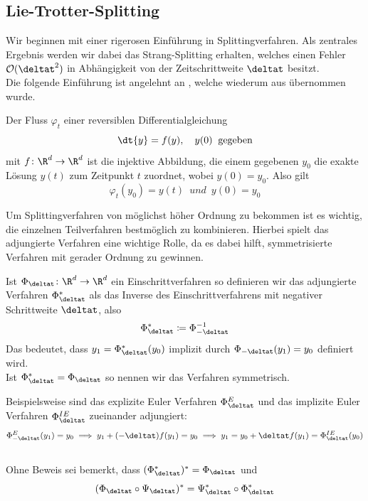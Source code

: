 \subsection{Lie-Trotter-Splitting}
\label{seclietrotter}
Wir beginnen mit einer rigerosen Einführung in Splittingverfahren. Als zentrales Ergebnis werden wir dabei das Strang-Splitting erhalten, welches einen Fehler $\mathcal{O}(\deltat^2)$ in Abhängigkeit von der Zeitschrittweite $\deltat$ besitzt.\\
Die folgende Einführung ist angelehnt an \autocite{patrickdiplom}, welche wiederum aus \autocite[Kapitel II.3 bis II.5]{HairerLubichWanner} übernommen wurde.
\begin{mathdef}
Der Fluss $\varphi_t$ einer reversiblen Differentialgleichung
\begin{equation}
\label{orddgl}
\dt{y}=f(y),\quad y(0)\:\text{ gegeben}
\end{equation}
mit $f\colon \R^d\to\R^d$ ist die injektive Abbildung, die einem gegebenen $y_0$ die exakte Lösung $y(t)$ zum Zeitpunkt $t$ zuordnet, wobei $y(0)=y_0$. Also gilt
\begin{equation*}
\varphi_t(y_0)=y(t)\enspace und\enspace y(0)=y_0
\end{equation*}
\end{mathdef}

Um Splittingverfahren von möglichst höher Ordnung zu bekommen ist es wichtig, die einzelnen Teilverfahren bestmöglich zu kombinieren. Hierbei spielt das adjungierte Verfahren eine wichtige Rolle, da es dabei hilft, symmetrisierte Verfahren mit gerader Ordnung zu gewinnen.
\begin{mathdef}
Ist $\Phi_{\deltat}\colon\R^d\to\R^d$ ein Einschrittverfahren so definieren wir das adjungierte Verfahren $\Phi_{\deltat}^*$ als das Inverse des Einschrittverfahrens mit negativer Schrittweite $\deltat$, also \[\Phi_{\deltat}^*\coloneqq\Phi_{-\deltat}^{-1}\]
Das bedeutet, dass $y_1=\Phi_{\deltat}^*(y_0)$ implizit durch $\Phi_{-\deltat}(y_1)=y_0$ definiert wird.\\
Ist $\Phi_{\deltat}^*=\Phi_{\deltat}$ so nennen wir das Verfahren symmetrisch.
\end{mathdef}
Beispielsweise sind das explizite Euler Verfahren $\Phi_{\deltat}^E$ und das implizite Euler Verfahren $\Phi_{\deltat}^{IE}$ zueinander adjungiert: 
\[\Phi_{-\deltat}^E(y_1)=y_0\implies y_1+(-\deltat)f(y_1)=y_0\implies y_1=y_0+\deltat f(y_1)=\Phi_{\deltat}^{IE}(y_0)\] \\
Ohne Beweis sei bemerkt, dass $(\Phi_{\deltat}^*)^*=\Phi_{\deltat}$ und 
\begin{equation}
\label{adjlemma}
(\Phi_{\deltat}\circ \Psi_{\deltat})^*=\Psi_{\deltat}^* \circ \Phi_{\deltat}^*
\end{equation}

